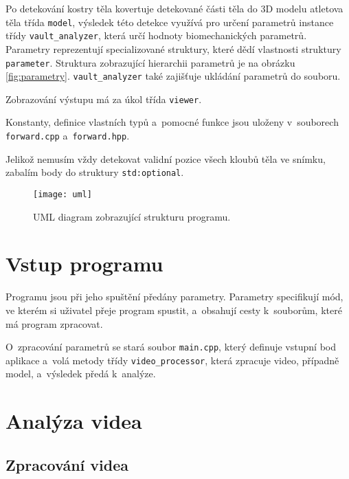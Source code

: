 Po detekování kostry těla kovertuje detekované části těla do 3D modelu atletova těla třída \texttt{model}, výsledek této detekce využívá pro určení parametrů instance třídy \texttt{vault\_analyzer}, která určí hodnoty biomechanických parametrů. Parametry reprezentují specializované struktury, které dědí vlastnosti struktury \texttt{parameter}. Struktura zobrazující hierarchii parametrů je na obrázku \ref{fig:parametry}. \texttt{vault\_analyzer} také zajišťuje ukládání parametrů do souboru.

Zobrazování výstupu má za úkol třída \texttt{viewer}.

Konstanty, definice vlastních typů a~pomocné funkce jsou uloženy v~souborech \texttt{forward.cpp} a~\texttt{forward.hpp}.

Jelikož nemusím vždy detekovat validní pozice všech kloubů těla ve snímku, zabalím body do struktury \texttt{std\::optional}.

\begin{figure}[h]\centering
    \texttt{[image: uml]}
    \caption{UML diagram zobrazující strukturu programu.}
    \label{fig:uml_schema}
\end{figure}







\section{Vstup programu}

Programu jsou při jeho spuštění předány parametry. Parametry specifikují mód, ve kterém si uživatel přeje program spustit, a~obsahují cesty k~souborům, které má program zpracovat.

O~zpracování parametrů se stará soubor \texttt{main.cpp}, který definuje vstupní bod aplikace a~volá metody třídy \texttt{video\_processor}, která zpracuje video, případně model, a~výsledek předá k~analýze.




\section{Analýza videa}

\subsection{Zpracování videa}


